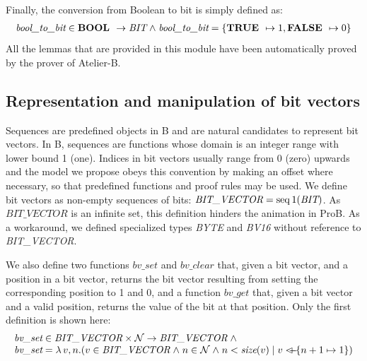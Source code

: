 \documentclass[a4paper]{llncs}
\begin{document}
Finally, the conversion from Boolean to bit is simply defined as:
$$
\begin{array}{l}
\textit{bool\_to\_bit} \in \textbf{BOOL } \rightarrow \textit{BIT} \mathrel{\wedge} \textit{bool\_to\_bit} = \{ \textbf{TRUE } \mapsto 1, \textbf{FALSE } \mapsto 0 \} \\
\end{array}
$$
All the lemmas that are provided in this module have been
automatically proved by the prover of Atelier-B.


\subsection{Representation and manipulation of bit vectors}
\label{subsec:HardwareLibrary2}

Sequences are predefined objects in B and are natural candidates to
represent bit vectors. In B, sequences are functions whose domain
is an integer range with lower bound 1 (one). Indices in bit vectors
usually range from 0 (zero) upwards and the model we propose obeys
this convention by making an offset where necessary, so that
predefined functions and proof rules may be used. We define bit
vectors as non-empty sequences of bits: $\textit{BIT\_VECTOR} =
\mathop{\mathstrut{\rm seq}}\nolimits1 (\textit{BIT})$. As $\textit{BIT\_VECTOR}$ is an infinite set,
this definition hinders the animation in ProB.  As a workaround, we
defined specialized types \textit{BYTE} and \textit{BV16} without
reference to \textit{BIT\_VECTOR}.

%

We also define two functions $\textit{bv\_set}$ and
$\textit{bv\_clear}$ that, given a bit vector, and a position in a
bit vector, returns the bit vector resulting from setting the
corresponding position to 1 and 0, and a function $\textit{bv\_get}$
that, given a bit vector and a valid position, returns the value of
the bit at that position. Only the first definition is shown here:
$$
\begin{array}{l}
\textit{bv\_set} \in \textit{BIT\_VECTOR} \times \nat \fun \textit{BIT\_VECTOR} \land \\ \textit{bv\_set} =
\lambda v, n . (v \in \textit{BIT\_VECTOR} \land n \in \nat \land n <\textit{size}(v)
\mid v \lover \{ n+1 \mapsto 1 \})
\end{array}
$$
\end{document}
